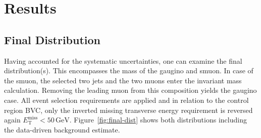 \chapter{Results}
\label{cha:results}

\section{Final Distribution}
\label{sec:final-dist}

Having accounted for the systematic uncertainties, one can examine the final distribution(s). This encompasses the mass of the gaugino and smuon. In case of the smuon, the selected two jets and the two muons enter the invariant mass calculation. Removing the leading muon from this composition yields the gaugino case. All event selection requirements are applied and in relation to the control region BVC, only the inverted missing transverse energy requirement is reversed again $E_{\text{T}}^{\text{miss}} < 50\,\text{GeV}$. Figure~\ref{fig:final-dist} shows both distributions including the data-driven background estimate.

